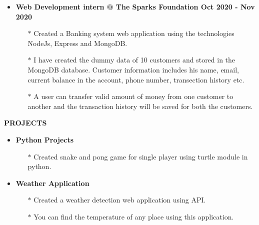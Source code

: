 \documentclass{article}
\begin{document}
{{{{{{\begin{itemize}
\end{itemize}
\begin{itemize}
\item   {\bf Web Development intern @ The Sparks Foundation {\hfill Oct 2020 - Nov 2020}}
\vspace{-2mm}
\begin{itemize}
  \vspace{0.5mm}
  \item[$\ast$] Created a Banking system web application using the technologies NodeJs, Express and MongoDB. 
  \vspace{-0.5mm}
  \item[$\ast$] I have created the dummy data of 10 customers and stored in the MongoDB database. Customer information includes his name, email, current balance in the account, phone number, transection history etc.
  \vspace{-0.5mm}
  \item[$\ast$] A user can transfer valid amount of money from one customer to another and the transaction history will be saved for both the customers.  
\end{itemize}

\end{itemize}




\vspace{4mm}

{\medskip
\large { {\bf  \color[rgb]{0,0,1} PROJECTS}} \hrulefill \par
\normalsize

\begin{itemize}


\item   {\bf Python Projects}
\vspace{-2mm}
\begin{itemize}
  \vspace{0.5mm}
  \item[$\ast$] Created snake and pong game for single player using turtle module in python.
 
\end{itemize}


\item   {\bf Weather Application}
\vspace{-2mm}
\begin{itemize}
  \vspace{0.5mm}
  \item[$\ast$] Created a weather detection web application using API.
  \vspace{-0.5mm}
  \item[$\ast$] You can find the temperature of any place using this application.
\end{itemize}


\end{itemize}}}}}}}}
\end{document}
